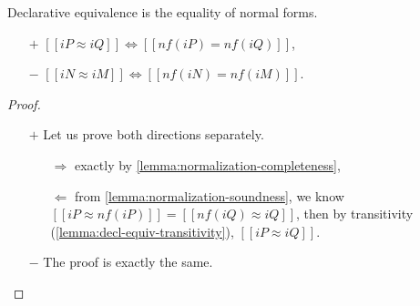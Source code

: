 \begin{lemma}
  \label{lemma:decl-equiv-algorithmization}
  Declarative equivalence is the equality of normal forms. 
  \begin{itemize}
    \item[$+$] $[[iP ≈ iQ]] \iff [[nf(iP) = nf(iQ)]]$,
    \item[$-$] $[[iN ≈ iM]] \iff [[nf(iN) = nf(iM)]]$.
  \end{itemize}
\end{lemma}
\begin{proof} \hfill
  \begin{itemize}
    \item[$+$] Let us prove both directions separately.
    \begin{itemize}
      \item[$\Rightarrow$] 
        exactly by \cref{lemma:normalization-completeness},
      \item[$\Leftarrow$] 
        from \cref{lemma:normalization-soundness}, we know
        $[[iP ≈ nf(iP)]] = [[nf(iQ) ≈ iQ]]$, then by transitivity (\cref{lemma:decl-equiv-transitivity}),
        $[[iP ≈ iQ]]$.
    \end{itemize}
    \item[$-$] The proof is exactly the same.
  \end{itemize}
\end{proof}

